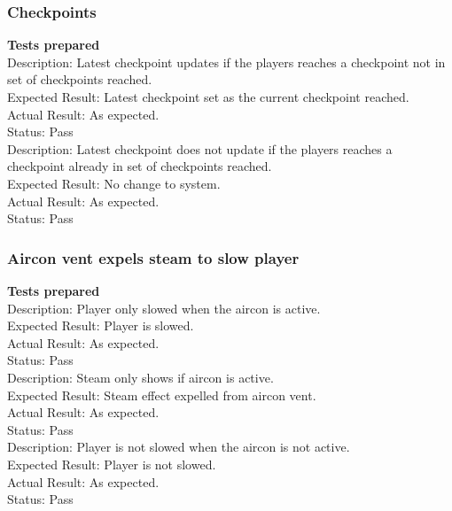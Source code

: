 \documentclass[11pt,a4paper]{article}
\begin{document}
\subsubsection{Checkpoints}
\textbf{Tests prepared}\\
Description: Latest checkpoint updates if the players reaches a checkpoint not in set of checkpoints reached.\\
Expected Result: Latest checkpoint set as the current checkpoint reached.\\
Actual Result: As expected.\\
Status: Pass
\smallskip\\
Description: Latest checkpoint does not update if the players reaches a checkpoint already in set of checkpoints reached.\\
Expected Result: No change to system.\\
Actual Result: As expected.\\
Status: Pass
\subsubsection{Aircon vent expels steam to slow player}
\textbf{Tests prepared}\\
Description: Player only slowed when the aircon is active.\\
Expected Result: Player is slowed.\\
Actual Result: As expected.\\
Status: Pass
\smallskip\\
Description: Steam only shows if aircon is active.\\
Expected Result: Steam effect expelled from aircon vent.\\
Actual Result: As expected.\\
Status: Pass
\smallskip\\
Description: Player is not slowed when the aircon is not active.\\
Expected Result: Player is not slowed.\\
Actual Result: As expected.\\
Status: Pass
\end{document}
